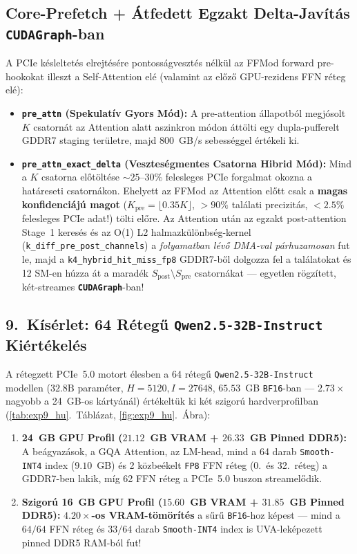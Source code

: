 \documentclass[10pt,twocolumn]{article}
\begin{document}
\subsection{Core-Prefetch + Átfedett Egzakt Delta-Javítás \texttt{CUDAGraph}-ban}
A PCIe késleltetés elrejtésére pontosságvesztés nélkül az FFMod forward pre-hookokat illeszt a Self-Attention elé (valamint az előző GPU-rezidens FFN réteg elé):
\begin{itemize}
  \item \textbf{\texttt{pre\_attn} (Spekulatív Gyors Mód):} A pre-attention állapotból megjósolt $K$ csatornát az Attention alatt aszinkron módon áttölti egy dupla-pufferelt GDDR7 staging területre, majd $800$~GB/s sebességgel értékeli ki.
  \item \textbf{\texttt{pre\_attn\_exact\_delta} (Veszteségmentes Csatorna Hibrid Mód):} Mind a $K$ csatorna előtöltése $\sim 25\text{--}30\%$ felesleges PCIe forgalmat okozna a határeseti csatornákon. Ehelyett az FFMod az Attention előtt csak a \textbf{magas konfidenciájú magot} ($K_{\mathrm{pre}} = \lfloor 0.35 K\rfloor$, $>90\%$ találati precizitás, $<2.5\%$ felesleges PCIe adat!) tölti előre. Az Attention után az egzakt post-attention Stage~1 keresés és az O(1) L2 halmazkülönbség-kernel (\texttt{k\_diff\_pre\_post\_channels}) a \emph{folyamatban lévő DMA-val párhuzamosan} fut le, majd a \texttt{k4\_hybrid\_hit\_miss\_fp8} GDDR7-ből dolgozza fel a találatokat és 12 SM-en húzza át a maradék $S_{\mathrm{post}}\setminus S_{\mathrm{pre}}$ csatornákat --- egyetlen rögzített, két-streames \textbf{\texttt{CUDAGraph}}-ban!
\end{itemize}

\subsection{9.\ Kísérlet: 64 Rétegű \texttt{Qwen2.5-32B-Instruct} Kiértékelés}
A rétegzett PCIe~5.0 motort élesben a 64 rétegű \texttt{Qwen2.5-32B-Instruct} modellen ($32.8\text{B}$ paraméter, $H=5120, I=27648$, $65.53$~GB \texttt{BF16}-ban --- $2.73\times$ nagyobb a 24~GB-os kártyánál) értékeltük ki két szigorú hardverprofilban (\ref{tab:exp9_hu}.\ Táblázat, \ref{fig:exp9_hu}.\ Ábra):
\begin{enumerate}
  \item \textbf{24~GB GPU Profil ($21.12$~GB VRAM + $26.33$~GB Pinned DDR5):} A beágyazások, a GQA Attention, az LM-head, mind a 64 darab \texttt{Smooth-INT4} index ($9.10$~GB) és 2 közbeékelt \texttt{FP8} FFN réteg (0.\ és 32.\ réteg) a GDDR7-ben lakik, míg 62 FFN réteg a PCIe~5.0 buszon streamelődik.
  \item \textbf{Szigorú 16~GB GPU Profil ($15.60$~GB VRAM + $31.85$~GB Pinned DDR5):} \textbf{$4.20\times$-os VRAM-tömörítés} a sűrű \texttt{BF16}-hoz képest --- mind a $64/64$ FFN réteg és $33/64$ darab \texttt{Smooth-INT4} index is UVA-leképezett pinned DDR5 RAM-ból fut!
\end{enumerate}
\end{document}
